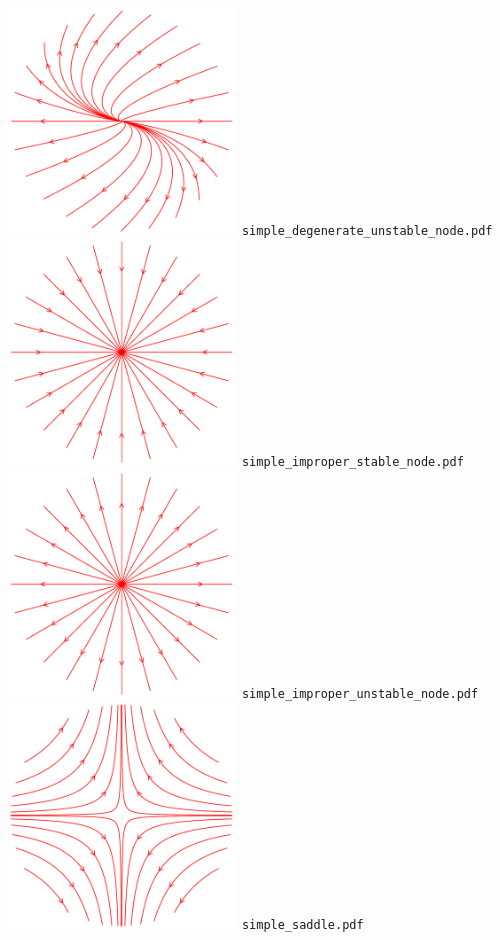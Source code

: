 \documentclass[a4paper]{amsart}
\begin{document}
\includegraphics[width=6cm]{simple_degenerate_unstable_node.pdf}\verb+ simple_degenerate_unstable_node.pdf+\\
\includegraphics[width=6cm]{simple_improper_stable_node.pdf}\verb+ simple_improper_stable_node.pdf+\\
\includegraphics[width=6cm]{simple_improper_unstable_node.pdf}\verb+ simple_improper_unstable_node.pdf+\\
\includegraphics[width=6cm]{simple_saddle.pdf}\verb+ simple_saddle.pdf+\\
\end{document}

